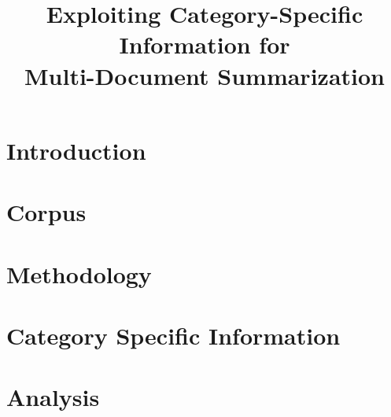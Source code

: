 \documentclass[10pt,a5paper,twoside]{article}
\title{Exploiting Category-Specific Information for \\Multi-Document Summarization}
\begin{document}
\maketitle

\abstractEn{

}



\newpage

\section{Introduction}


\section{Corpus}
\label{sec:corpus}


\section{Methodology}
\label{sec:methodology}


\section{Category Specific Information}
\label{sec:csi}

%
%
\section{Analysis}
\label{sec:analysis}


\end{document}
